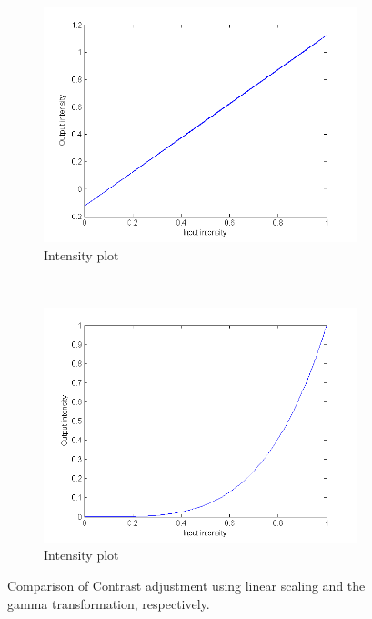 \documentclass[a4paper]{article}
\begin{document}
\begin{figure}[H]
	\vspace{3mm}
	\begin{subfigure}[h]{0.48\textwidth}
		\centering
		\includegraphics[width=\textwidth]{linearContrast_plot2}
		\caption*{Intensity plot}
	\end{subfigure}	
	~
	\begin{subfigure}[h]{0.48\textwidth}
		\centering
		\includegraphics[width=\textwidth]{gammaContrast_plot2}
		\caption*{Intensity plot}
	\end{subfigure}	
\caption{Comparison of Contrast adjustment using linear scaling and the gamma transformation, respectively.}
\label{fig:contrast-2}
\end{figure}
\end{document}
